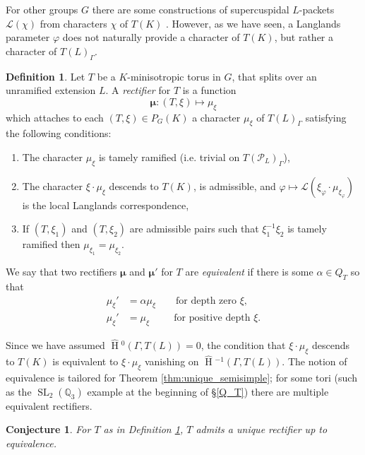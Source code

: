 \documentclass{compositio}
\theoremstyle{plain}
\newtheorem{conjecture}[theorem]{Conjecture}
\newcommand{\HT}[1]{\hat{\HH}{}^{#1}}
\theoremstyle{definition}
\newtheorem{definition}[theorem]{Definition}
\DeclareMathOperator{\HH}{H}
\DeclareMathOperator{\SL}{SL}
\newcommand{\PL}{\mathcal{P}_L}
\newcommand{\Lpack}{\mathcal{L}}
\newcommand{\bmu}{\boldsymbol\mu}
\begin{document}
For other groups $G$ there are some constructions of supercuspidal $L$-packets $\Lpack(\chi)$
from characters $\chi$ of $T(K)$ \cite{reeder-debacker:09a, kaletha:13a, reeder:08a}.
However, as we have seen, a Langlands parameter $\varphi$ does not naturally
provide a character of $T(K)$, but rather a character of
$T(L)_{\Gamma}$.

\begin{definition} \label{def:rectifier}
  Let $T$ be a $K$-minisotropic torus in $G$, that splits over an unramified
  extension $L$.  A \emph{rectifier} for $T$ is a function
  $$\bmu : (T, \xi) \mapsto \mu_{\xi}$$
  which attaches to each $(T, \xi) \in P_G(K)$ a character
  $\mu_{\xi}$ of $T(L)_{\Gamma}$ satisfying the following conditions:

\begin{enumerate}
\item The character $\mu_{\xi}$ is tamely ramified (i.e. trivial on
  $T(\PL)_{\Gamma}$),

\item The character $\xi \cdot \mu_{\xi}$ descends to $T(K)$, is admissible,
and $\varphi \mapsto \Lpack(\xi_{\varphi} \cdot \mu_{\xi_{\varphi}})$
  is the local Langlands correspondence,

\item If $(T, \xi_1)$ and $(T, \xi_2)$ are admissible pairs such that
$\xi_1^{-1} \xi_2$ is tamely ramified then
$\mu_{\xi_1} = \mu_{\xi_2}$.
\end{enumerate}
We say that two rectifiers $\bmu$ and $\bmu'$ for $T$ are \emph{equivalent}
if there is some $\alpha \in Q_T$ so that
\begin{align*}
\mu_\xi' &= \alpha \mu_\xi \qquad \mbox{for depth zero $\xi$,} \\
\mu_\xi' &= \mu_\xi \qquad\ \  \mbox{for positive depth $\xi$.}
\end{align*}

\end{definition}

Since we have assumed $\HT{0}(\Gamma,T(L)) = 0$, the condition that $\xi \cdot \mu_\xi$
descends to $T(K)$ is equivalent to $\xi \cdot \mu_\xi$ vanishing on $\HT{-1}(\Gamma, T(L))$.  The
notion of equivalence is tailored for Theorem \ref{thm:unique_semisimple}; for some tori (such as the
$\SL_2(\mathbb{Q}_3)$ example at the beginning of \S \ref{Q_T}) there are
multiple equivalent rectifiers.

\begin{conjecture} \label{conj:unique_rectifier}
For $T$ as in Definition \ref{def:rectifier}, $T$ admits a unique rectifier up to equivalence.
\end{conjecture}
\end{document}
